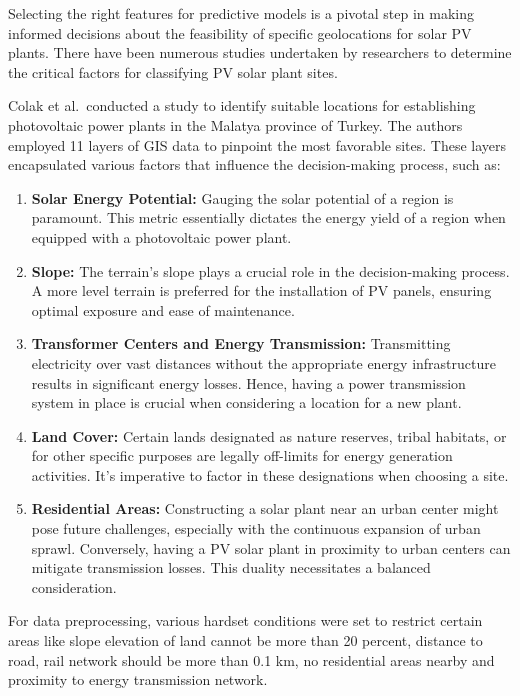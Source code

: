 \documentclass[a4paper,12pt]{Classes/RoboticsLaTeX}
\begin{document}
	Selecting the right features for predictive models is a pivotal step in making informed decisions about the feasibility of specific geolocations for solar PV plants. There have been numerous studies undertaken by researchers to determine the critical factors for classifying PV solar plant sites.

	Colak et al.\ conducted a study to identify suitable locations for establishing photovoltaic power plants in the Malatya province of Turkey\cite{colak2020}. The authors employed 11 layers of GIS data to pinpoint the most favorable sites. These layers encapsulated various factors that influence the decision-making process, such as:

	\begin{enumerate}
		\item \textbf{Solar Energy Potential:} Gauging the solar potential of a region is paramount. This metric essentially dictates the energy yield of a region when equipped with a photovoltaic power plant.
		
		\item \textbf{Slope:} The terrain's slope plays a crucial role in the decision-making process. A more level terrain is preferred for the installation of PV panels, ensuring optimal exposure and ease of maintenance.
		
		\item \textbf{Transformer Centers and Energy Transmission:} Transmitting electricity over vast distances without the appropriate energy infrastructure results in significant energy losses. Hence, having a power transmission system in place is crucial when considering a location for a new plant.
		
		\item \textbf{Land Cover:} Certain lands designated as nature reserves, tribal habitats, or for other specific purposes are legally off-limits for energy generation activities. It's imperative to factor in these designations when choosing a site.
		
		\item \textbf{Residential Areas:} Constructing a solar plant near an urban center might pose future challenges, especially with the continuous expansion of urban sprawl. Conversely, having a PV solar plant in proximity to urban centers can mitigate transmission losses. This duality necessitates a balanced consideration.
	\end{enumerate}

	For data preprocessing, various hardset conditions were set to restrict certain areas like slope elevation of land cannot be more than 20 percent,
	distance to road, rail network should be more than 0.1 km, no residential areas nearby and proximity to energy transmission network.
\end{document}
